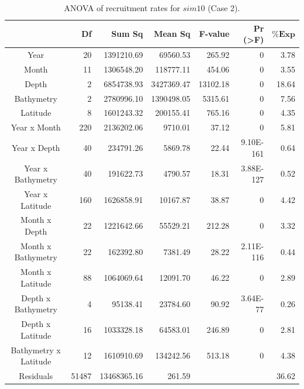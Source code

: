 \begin{table}[H]
\centering
\begin{adjustbox}{width=0.9\textwidth}
\small
\begin{tabular}{c|r|r|r|r|r|r}
\hline
                                  &
	\textbf{Df}                   &
	\textbf{Sum Sq}               &
	\textbf{Mean Sq}              &
	\textbf{F-value}    		   &
	\textbf{Pr (\textgreater{F})} &
	$\mathbf{\% Exp}$      \\
\hline
Year                  & 20    & 1391210.69  & 69560.53   & 265.92   & 0                   & 3.78  \\
Month                 & 11    & 1306548.20  & 118777.11  & 454.06   & 0                   & 3.55  \\
Depth                 & 2     & 6854738.93  & 3427369.47 & 13102.18 & 0                   & 18.64 \\
Bathymetry            & 2     & 2780996.10  & 1390498.05 & 5315.61  & 0                   & 7.56  \\
Latitude              & 8     & 1601243.32  & 200155.41  & 765.16   & 0                   & 4.35  \\
Year x Month          & 220   & 2136202.06  & 9710.01    & 37.12    & 0                   & 5.81  \\
Year x Depth          & 40    & 234791.26   & 5869.78    & 22.44    & 9.10E-161           & 0.64  \\
Year x Bathymetry     & 40    & 191622.73   & 4790.57    & 18.31    & 3.88E-127           & 0.52  \\
Year x Latitude       & 160   & 1626858.91  & 10167.87   & 38.87    & 0                   & 4.42  \\
Month x Depth         & 22    & 1221642.66  & 55529.21   & 212.28   & 0                   & 3.32  \\
Month x Bathymetry    & 22    & 162392.80   & 7381.49    & 28.22    & 2.11E-116           & 0.44  \\
Month x Latitude      & 88    & 1064069.64  & 12091.70   & 46.22    & 0                   & 2.89  \\
Depth x Bathymetry    & 4     & 95138.41    & 23784.60   & 90.92    & 3.64E-77            & 0.26  \\
Depth x Latitude      & 16    & 1033328.18  & 64583.01   & 246.89   & 0                   & 2.81  \\
Bathymetry x Latitude & 12    & 1610910.69  & 134242.56  & 513.18   & 0                   & 4.38  \\
Residuals             & 51487 & 13468365.16 & 261.59     &          &                     & 36.62 \\
\hline
\end{tabular}
\end{adjustbox}
\caption{ANOVA of recruitment rates for $sim 10$ (Case 2).}
\label{ANOVAsim10}
\end{table}

